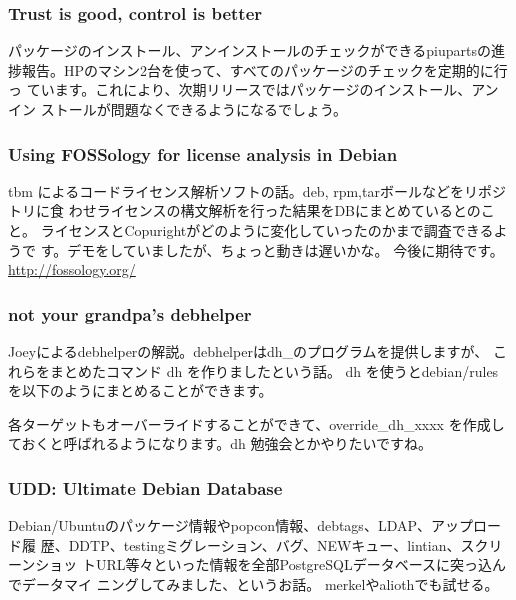 \documentclass[mingoth,a4paper]{jsarticle}
\begin{document}
\subsubsection{Trust is good, control is better}

パッケージのインストール、アンインストールのチェックができるpiupartsの進
捗報告。HPのマシン2台を使って、すべてのパッケージのチェックを定期的に行っ
ています。これにより、次期リリースではパッケージのインストール、アンイン
ストールが問題なくできるようになるでしょう。

\subsubsection{Using FOSSology for license analysis in Debian} 

tbm によるコードライセンス解析ソフトの話。deb, rpm,tarボールなどをリポジトリに食
わせライセンスの構文解析を行った結果をDBにまとめているとのこと。
ライセンスとCopurightがどのように変化していったのかまで調査できるようで
す。デモをしていましたが、ちょっと動きは遅いかな。
今後に期待です。\url{http://fossology.org/}

\subsubsection{not your grandpa's debhelper}

Joeyによるdebhelperの解説。debhelperはdh\_\*のプログラムを提供しますが、
これらをまとめたコマンド dh を作りましたという話。
dh を使うとdebian/rules を以下のようにまとめることができます。
各ターゲットもオーバーライドすることができて、override\_dh\_xxxx を作成し
ておくと呼ばれるようになります。dh 勉強会とかやりたいですね。

\subsubsection{UDD: Ultimate Debian Database}
Debian/Ubuntuのパッケージ情報やpopcon情報、debtags、LDAP、アップロード履
歴、DDTP、testingミグレーション、バグ、NEWキュー、lintian、スクリーンショッ
トURL等々といった情報を全部PostgreSQLデータベースに突っ込んでデータマイ
ニングしてみました、というお話。
merkelやaliothでも試せる。
\end{document}

